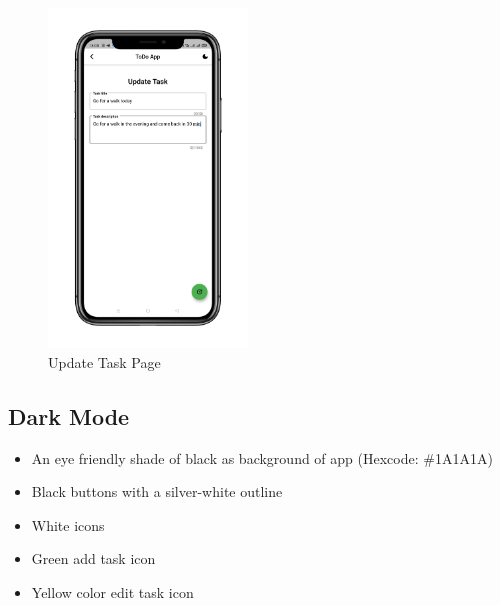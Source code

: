 \begin{figure}[h]
  \begin{center}
   \includegraphics[height=90mm]{Images & Logos/theme/CH_08_Light_5.png}
  \end{center}
  \caption{Update Task Page}
\end{figure}  
\newpage
\hfill
\subsection{Dark Mode}
\begin{itemize}
\item An eye friendly shade of black as background of app (Hexcode: \#1A1A1A)
\item Black buttons with a silver-white outline
\item White icons
\item Green add task icon
\item Yellow color edit task icon
\end{itemize}

